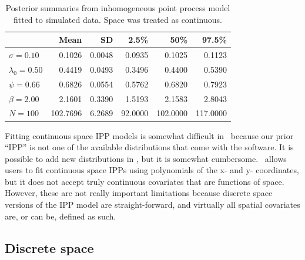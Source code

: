\begin{table}[b]
\centering
\caption{Posterior summaries from inhomogeneous point process model
  fitted to simulated data. Space was treated as continuous.}
\begin{tabular}{lrrrrr}
\hline
& Mean & SD & 2.5\% & 50\% & 97.5\% \\
\hline
 $\sigma =0.10$ &   0.1026 &   0.0048 &   0.0935 &   0.1025 &   0.1123 \\
 $\lambda_0=0.50$ &   0.4419 &   0.0493 &   0.3496 &   0.4400 &   0.5390 \\
 $\psi =0.66$ &   0.6826 &   0.0554 &   0.5762 &   0.6820 &   0.7923 \\
 $\beta =2.00$ &   2.1601 &   0.3390 &   1.5193 &   2.1583 &   2.8043 \\
 $N =100$ & 102.7696 &   6.2689 &  92.0000 & 102.0000 & 117.0000 \\
\hline
\end{tabular}
\label{ch9.tab.simIPP}
\end{table}


Fitting continuous space IPP models is somewhat
difficult in \bugs~because our prior ``IPP'' is not one of the
available distributions that come with the software. It is
possible to add new distributions in \bugs, but it is somewhat
cumbersome.  \secr~allows
users to fit continuous space IPPs using polynomials of the x- and y-
coordinates, but it does not accept truly continuous covariates that
are functions of space. However, these
are not really important limitations because discrete
space versions of the IPP model are straight-forward, and virtually all spatial
covariates are, or can be, defined as such.


\subsection{Discrete space}

